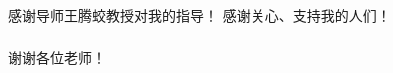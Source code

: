 \begin{transparentFootline_lastpages}
{

\begin{frame}
\frametitle{}
{\color{white}感谢导师王腾蛟教授对我的指导！}
\vfill
{\color{white}感谢关心、支持我的人们！}
\vfill
\end{frame}
}
\end{transparentFootline_lastpages}


\begin{transparentFootline_lastpages}
{

\begin{frame}
\frametitle{}
{\color{white}谢谢各位老师！}
\vfill

\end{frame}
}

\end{transparentFootline_lastpages}